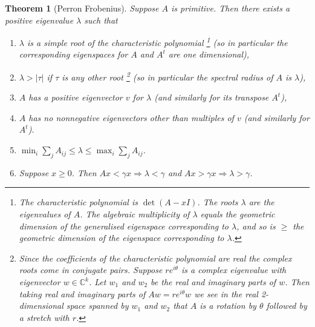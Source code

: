\documentclass[a4paper]{amsart}
\theoremstyle{plain}
\newtheorem{theorem}{Theorem}[section]
\theoremstyle{definition}
\theoremstyle{remark}
\begin{document}
\begin{theorem}[Perron Frobenius] \label{pft} Suppose $ A $ is primitive.  Then there exists a positive eigenvalue $ \lambda $ such that
\begin{enumerate}
\item $ \lambda  $ is a simple root of the characteristic polynomial %
\footnote{The characteristic polynomial is $ \det (A-xI) $.  The roots $ \lambda $ are the eigenvalues of $ A $.  The algebraic multiplicity of $ \lambda $ equals  the geometric dimension  of the   \emph{generalised} eigenspace corresponding to $ \lambda $, and  so is $ \geq $ the geometric dimension of the eigenspace corresponding to  $\lambda $.}
(so in particular the corresponding eigenspaces for $ A $ and $ A^t $ are one dimensional),
\item $ \lambda  > |\tau| $ if $\tau $ is any other root %
\footnote{\label{arot}Since the coefficients of the characteristic polynomial are real the complex roots come in conjugate pairs.  Suppose $ re^{i\theta} $ is a complex eigenvalue with eigenvector $ w \in \mathbb{C} ^k $.  Let $ w_1 $ and $ w_2 $ be the  real and imaginary parts of $ w $.  Then  taking real and imaginary parts of $ Aw =  re^{i\theta} w $ we  see  in the real 2-dimensional space spanned by $w_1 $ and $ w_2$ that $ A $ is a rotation by $ \theta $ followed by a stretch with $ r $.} 
(so  in particular the spectral radius  of  $ A $ is $ \lambda $),
\item $ A $ has a positive eigenvector $ v $ for $ \lambda $ (and similarly for its transpose $ A^t $), 
\item $ A $ has no nonnegative eigenvectors other than multiples of $v  $  (and similarly for $ A^t $).  
\item   $ \min_i \sum_jA_{ij} \leq \lambda \leq \max_i \sum_j A_{ij} $.
\item Suppose    $ x \geq 0 $.   Then $ Ax < \gamma x \Longrightarrow \lambda < \gamma  $ and $ Ax > \gamma x \Longrightarrow \lambda > \gamma  $.
\end{enumerate} 
\end{theorem} 
\end{document}
